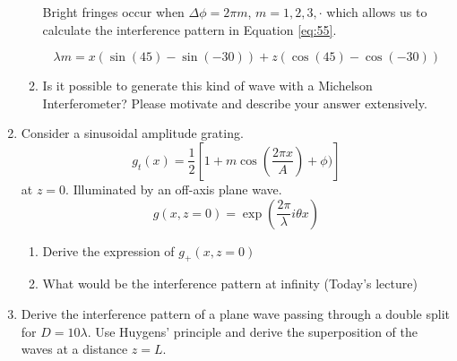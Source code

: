 \documentclass[main.tex]{subfiles}
\begin{document}
\begin{enumerate}
\begin{enumerate}
Bright fringes occur when $\Delta \phi = 2\pi m$, $m=1,2,3,\cdot$ which allows us to calculate the interference pattern in Equation \ref{eq:55}.

\begin{equation}\label{eq:55}
\lambda m =  x(\sin(45)-\sin(-30)) + z(\cos(45)-\cos(-30))
\end{equation}

\item Is it possible to generate this kind of wave with a Michelson Interferometer? Please motivate and describe your answer extensively.
\end{enumerate}
\item{Consider a sinusoidal amplitude grating.}
$$g_t(x)=\frac{1}{2}\left[ 1+m\cos(\frac{2\pi x}{A}) + \phi) \right]$$
at $z=0$. Illuminated by an off-axis plane wave.
$$g(x,z=0)=\exp(\frac{2\pi}{\lambda}i \theta x)$$
\begin{enumerate}
\item{Derive the expression of $g_{\text{+}}(x,z=0)$}
\item{What would be the interference pattern at infinity (Today's lecture)}
\end{enumerate}
\item{Derive the interference pattern of a plane wave passing through a double split for $D=10\lambda$. Use Huygens' principle and derive the superposition of the waves at a distance $z=L$.}
\end{enumerate}
\end{document}
